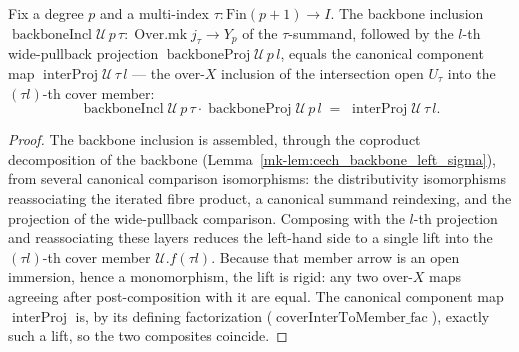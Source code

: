 \begin{lemma}
  \label{mk-lem:backboneIncl_proj}

  Fix a degree \(p\) and a multi-index \(\tau : \mathrm{Fin}(p+1) \to I\). The backbone inclusion
  \(\operatorname{backboneIncl}\mathcal{U}\,p\,\tau : \operatorname{Over.mk} j_\tau \to Y_p\) of the
  \(\tau\)-summand, followed by the \(l\)-th wide-pullback projection
  \(\operatorname{backboneProj}\mathcal{U}\,p\,l\), equals the canonical component map
  \(\operatorname{interProj}\mathcal{U}\,\tau\,l\) — the over-\(X\) inclusion of the intersection
  open \(U_\tau\) into the \((\tau l)\)-th cover member:
  \[
    \operatorname{backboneIncl}\mathcal{U}\,p\,\tau\cdot
      \operatorname{backboneProj}\mathcal{U}\,p\,l
      \;=\;
    \operatorname{interProj}\mathcal{U}\,\tau\,l.
  \]
\end{lemma}
\begin{proof}
  The backbone inclusion is assembled, through the coproduct decomposition of the backbone
  (Lemma~\ref{mk-lem:cech_backbone_left_sigma}), from several canonical comparison isomorphisms: the
  distributivity isomorphisms reassociating the iterated fibre product, a canonical summand
  reindexing, and the projection of the wide-pullback comparison. Composing
  with the \(l\)-th projection and reassociating these layers reduces the left-hand side to a single
  lift into the \((\tau l)\)-th cover member \(\mathcal{U}.f(\tau l)\). Because that member arrow is
  an open immersion, hence a monomorphism, the lift is rigid: any two over-\(X\) maps agreeing after
  post-composition with it are equal. The canonical component map \(\operatorname{interProj}\) is,
  by its defining factorization (\(\operatorname{coverInterToMember\_fac}\)), exactly such a lift, so
  the two composites coincide.
\end{proof}

